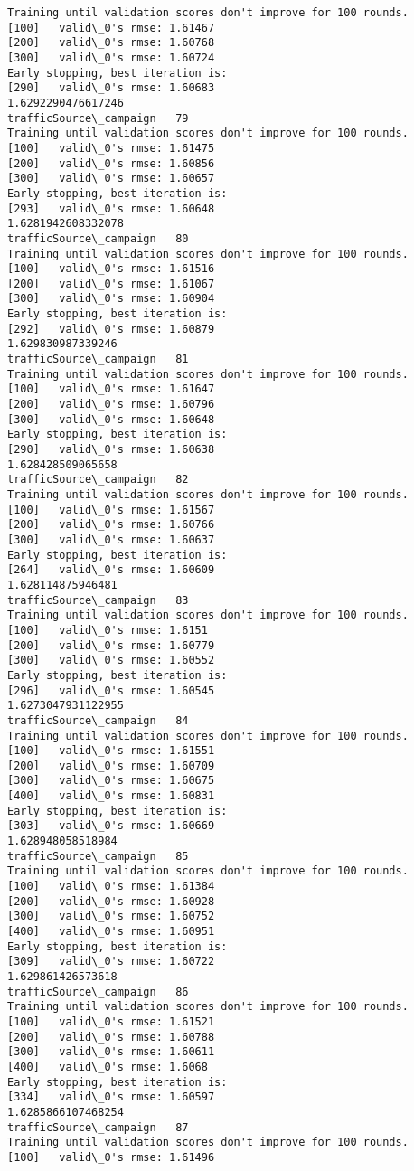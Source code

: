 \documentclass[11pt]{article}
\begin{document}
\begin{Verbatim}[commandchars=\\\{\}]
Training until validation scores don't improve for 100 rounds.
[100]	valid\_0's rmse: 1.61467
[200]	valid\_0's rmse: 1.60768
[300]	valid\_0's rmse: 1.60724
Early stopping, best iteration is:
[290]	valid\_0's rmse: 1.60683
1.6292290476617246
trafficSource\_campaign   79
Training until validation scores don't improve for 100 rounds.
[100]	valid\_0's rmse: 1.61475
[200]	valid\_0's rmse: 1.60856
[300]	valid\_0's rmse: 1.60657
Early stopping, best iteration is:
[293]	valid\_0's rmse: 1.60648
1.6281942608332078
trafficSource\_campaign   80
Training until validation scores don't improve for 100 rounds.
[100]	valid\_0's rmse: 1.61516
[200]	valid\_0's rmse: 1.61067
[300]	valid\_0's rmse: 1.60904
Early stopping, best iteration is:
[292]	valid\_0's rmse: 1.60879
1.629830987339246
trafficSource\_campaign   81
Training until validation scores don't improve for 100 rounds.
[100]	valid\_0's rmse: 1.61647
[200]	valid\_0's rmse: 1.60796
[300]	valid\_0's rmse: 1.60648
Early stopping, best iteration is:
[290]	valid\_0's rmse: 1.60638
1.628428509065658
trafficSource\_campaign   82
Training until validation scores don't improve for 100 rounds.
[100]	valid\_0's rmse: 1.61567
[200]	valid\_0's rmse: 1.60766
[300]	valid\_0's rmse: 1.60637
Early stopping, best iteration is:
[264]	valid\_0's rmse: 1.60609
1.628114875946481
trafficSource\_campaign   83
Training until validation scores don't improve for 100 rounds.
[100]	valid\_0's rmse: 1.6151
[200]	valid\_0's rmse: 1.60779
[300]	valid\_0's rmse: 1.60552
Early stopping, best iteration is:
[296]	valid\_0's rmse: 1.60545
1.6273047931122955
trafficSource\_campaign   84
Training until validation scores don't improve for 100 rounds.
[100]	valid\_0's rmse: 1.61551
[200]	valid\_0's rmse: 1.60709
[300]	valid\_0's rmse: 1.60675
[400]	valid\_0's rmse: 1.60831
Early stopping, best iteration is:
[303]	valid\_0's rmse: 1.60669
1.628948058518984
trafficSource\_campaign   85
Training until validation scores don't improve for 100 rounds.
[100]	valid\_0's rmse: 1.61384
[200]	valid\_0's rmse: 1.60928
[300]	valid\_0's rmse: 1.60752
[400]	valid\_0's rmse: 1.60951
Early stopping, best iteration is:
[309]	valid\_0's rmse: 1.60722
1.629861426573618
trafficSource\_campaign   86
Training until validation scores don't improve for 100 rounds.
[100]	valid\_0's rmse: 1.61521
[200]	valid\_0's rmse: 1.60788
[300]	valid\_0's rmse: 1.60611
[400]	valid\_0's rmse: 1.6068
Early stopping, best iteration is:
[334]	valid\_0's rmse: 1.60597
1.6285866107468254
trafficSource\_campaign   87
Training until validation scores don't improve for 100 rounds.
[100]	valid\_0's rmse: 1.61496

\end{Verbatim}
\end{document}
